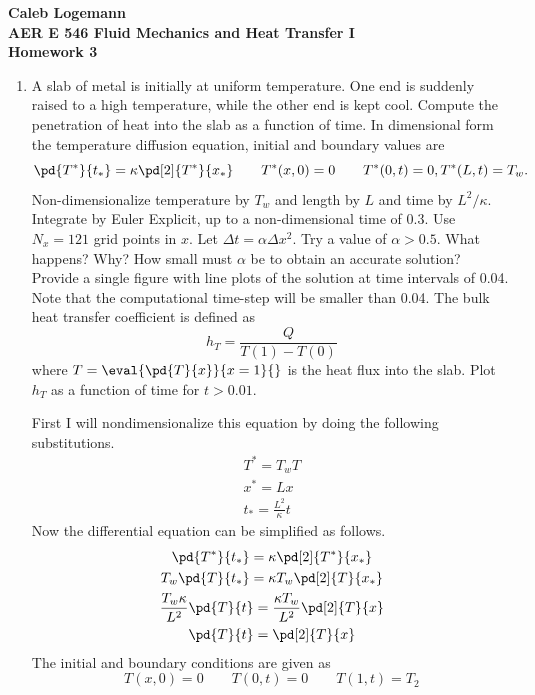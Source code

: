 \documentclass[11pt, oneside]{article}
\begin{document}
\noindent \textbf{\Large{Caleb Logemann \\
AER E 546 Fluid Mechanics and Heat Transfer I \\
Homework 3
}}

%
\begin{enumerate}
  \item %
    A slab of metal is initially at uniform temperature.
    One end is suddenly raised to a high temperature, while the other end is kept cool.
    Compute the penetration of heat into the slab as a function of time.
    In dimensional form the temperature diffusion equation, initial and boundary values are
    \[
      \pd{T^*}{t_*} = \kappa \pd[2]{T^*}{x_*} \qquad T^*(x,0) = 0 \qquad T^*(0, t) = 0, T^*(L, t) = T_w.
    \]
    Non-dimensionalize temperature by $T_w$ and length by $L$ and time by $L^2/\kappa$.
    Integrate by Euler Explicit, up to a non-dimensional time of $0.3$.
    Use $N_x = 121$ grid points in $x$.
    Let $\Delta t = \alpha \Delta x^2$.
    Try a value of $\alpha > 0.5$.
    What happens?
    Why?
    How small must $\alpha$ be to obtain an accurate solution?
    Provide a single figure with line plots of the solution at time intervals of 0.04.
    Note that the computational time-step will be smaller than 0.04.
    The bulk heat transfer coefficient is defined as
    \[
      h_T = \frac{Q}{T(1) - T(0)}
    \]
    where $T = \eval{\pd{T}{x}}{x = 1}{}$ is the heat flux into the slab.
    Plot $h_T$ as a function of time for $t > 0.01$.

    First I will nondimensionalize this equation by doing the following substitutions.
    \begin{gather}
      T^* = T_w T \\
      x^* = L x \\
      t_* = \frac{L^2}{\kappa} t
    \end{gather}
    Now the differential equation can be simplified as follows.
    \begin{gather}
      \pd{T^*}{t_*} = \kappa \pd[2]{T^*}{x_*} \\
      T_w \pd{T}{t_*} = \kappa T_w \pd[2]{T}{x_*} \\
      \frac{T_w \kappa}{L^2} \pd{T}{t} = \frac{\kappa T_w}{L^2} \pd[2]{T}{x} \\
      \pd{T}{t} = \pd[2]{T}{x}
    \end{gather}
    The initial and boundary conditions are given as
    \[
      T(x, 0) = 0 \qquad T(0, t) = 0 \qquad T(1, t) = T_2
    \]


\end{enumerate}
\end{document}

